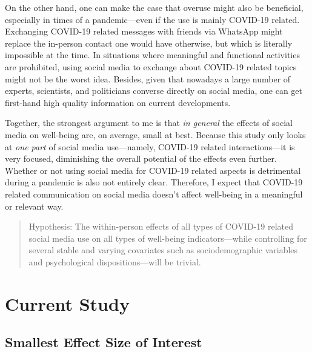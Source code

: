 \documentclass[
  english,
  man,floatsintext]{apa6}
\begin{document}
On the other hand, one can make the case that overuse might also be beneficial, especially in times of a pandemic---even if the use is mainly COVID-19 related.
Exchanging COVID-19 related messages with friends via WhatsApp might replace the in-person contact one would have otherwise, but which is literally impossible at the time.
In situations where meaningful and functional activities are prohibited, using social media to exchange about COVID-19 related topics might not be the worst idea.
Besides, given that nowadays a large number of experts, scientists, and politicians converse directly on social media, one can get first-hand high quality information on current developments.

Together, the strongest argument to me is that \emph{in general} the effects of social media on well-being are, on average, small at best.
Because this study only looks at \emph{one part} of social media use---namely, COVID-19 related interactions---it is very focused, diminishing the overall potential of the effects even further.
Whether or not using social media for COVID-19 related aspects is detrimental during a pandemic is also not entirely clear.
Therefore, I expect that COVID-19 related communication on social media doesn't affect well-being in a meaningful or relevant way.

\begin{quote}
Hypothesis: The within-person effects of all types of COVID-19 related social media use on all types of well-being indicators---while controlling for several stable and varying covariates such as sociodemographic variables and psychological dispositions---will be trivial.
\end{quote}

\hypertarget{current-study}{%
\section{Current Study}\label{current-study}}

\hypertarget{smallest-effect-size-of-interest}{%
\subsection{Smallest Effect Size of Interest}\label{smallest-effect-size-of-interest}}
\end{document}
